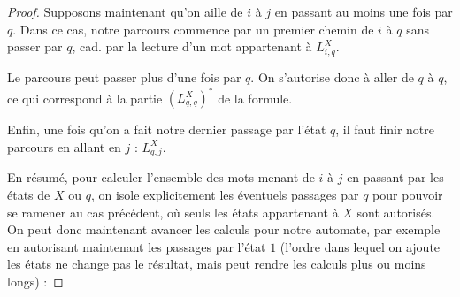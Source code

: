 \begin{proof}
Supposons maintenant qu'on aille de $i$ à $j$ en passant au moins une fois par $q$. Dans ce cas, notre parcours commence par un premier chemin de $i$ à $q$ sans passer par $q$, cad. par la lecture d'un mot appartenant à $L_{i,q}^X$.

Le parcours peut passer plus d'une fois par $q$. On s'autorise donc à aller de $q$ à $q$, ce qui correspond à la partie $(L_{q,q}^X)^*$ de la formule.

Enfin, une fois qu'on a fait notre dernier passage par l'état $q$, il faut finir notre parcours en allant en $j$ : $L_{q,j}^X$.

En résumé, pour calculer l'ensemble des mots menant de $i$ à $j$ en passant par les états de $X$ ou $q$, on isole explicitement les éventuels passages par $q$ pour pouvoir se ramener au cas précédent, où seuls les états appartenant à $X$ sont autorisés. On peut donc maintenant avancer les calculs pour notre automate, par exemple en autorisant maintenant les passages par l'état $1$ (l'ordre dans lequel on ajoute les états ne change pas le résultat, mais peut rendre les calculs plus ou moins longs) :



\end{proof}

